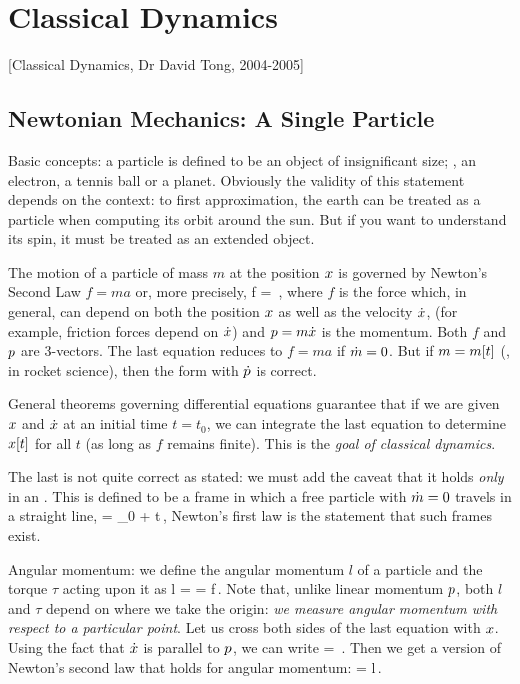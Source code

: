 \section{Classical Dynamics}

[Classical Dynamics, Dr David Tong, 2004-2005]

\subsection{Newtonian Mechanics: A Single Particle}
Basic concepts: a particle is defined to be an object of insignificant size; \eg, an electron, a tennis ball or a planet. Obviously the validity of this statement depends on the context: to first approximation, the earth can be treated as a particle when computing its orbit around the sun. But if you want to understand its spin, it must be treated as an extended object.

The motion of a particle of mass $m$ at the position $x$ is governed by Newton's Second Law $f=ma$ or, more precisely,
\beq
f\vat{\pvec,\dt\pvec} = \dt\lmom\,,
\eeq
where $f$ is the force which, in general, can depend on both the position $x$ as well as the velocity $\dot{x}$, (for example, friction forces depend on $\dot{x}$) and $p = m\dot{x}$ is the momentum. Both $f$ and $p$ are 3-vectors. The last equation reduces to $f = ma$ if $\dot{m} = 0$. But if $m = m\!\left[{t}\right]$ (\eg, in rocket science), then the form with $\dot{p}$ is correct.

General theorems governing differential equations guarantee that if we are given $x$ and $\dot{x}$ at an initial time $t = t_0$, we can integrate the last equation to determine $x\!\left[{t}\right]$ for all $t$ (as long as $f$ remains finite). This is the \emph{goal of classical dynamics}.

The last is not quite correct as stated: we must add the caveat that it holds \emph{only} in an . This is defined to be a frame in which a free particle with $\dot{m} = 0$ travels in a straight line,
\beq
\pvec = \pvec_0 + \dt\pvec t\,,
\eeq
Newton's first law is the statement that such frames exist.

Angular momentum: we define the angular momentum $l$ of a particle and the torque $\tau$ acting upon it as
\beq
l = \pvec\cprod\lmom\qquad{}\qquad\tau = \pvec\cprod f\,.
\eeq
Note that, unlike linear momentum $p$, both $l$ and $\tau$ depend on where we take the origin: \emph{we measure angular momentum with respect to a particular point}. Let us cross both sides of the last equation with $x$. Using the fact that $\dot{x}$ is parallel to $p$, we can write
\beq
{} = \pvec\cprod\dt\lmom\,.
\eeq
Then we get a version of Newton's second law that holds for angular momentum:
\beq
\tau = \dt l\,.
\eeq

